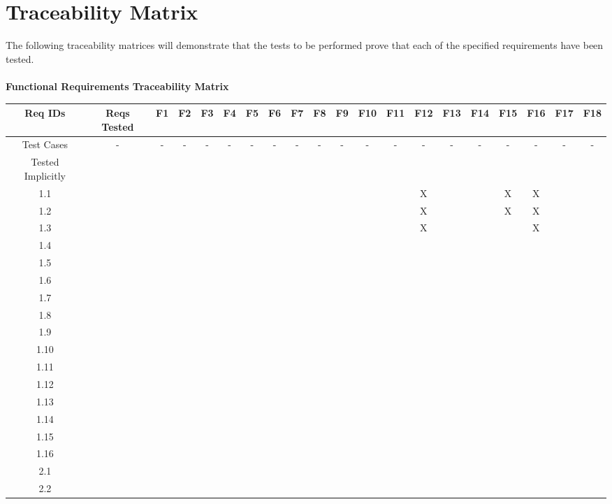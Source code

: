 \documentclass[titlepage]{article}
\begin{document}
\section{Traceability Matrix}
The following traceability matrices will demonstrate that the tests to be performed prove that each of the specified requirements have been tested.\\~\\
\large{\textbf{Functional Requirements Traceability Matrix}}
\begin{center}%
\begin{table}[h!]
\hspace*{-7.5mm}
\begin{tabular}{|c|c|c|c|c |c|c|c|c|c |c|c|c|c|c |c|c|c|c|c|}\hline
\multicolumn{1}{|C{1.5}|}{Req IDs}	&\multicolumn{1}{|C{1}|}{Reqs Tested}	&F1	&F2	&F3	&F4	&F5	&F6	&F7	&F8	&F9	&F10	&F11	&F12	&F13	&F14	&F15	&F16	&F17	&F18\\\hline
\multicolumn{1}{|C{1.5}|}{Test Cases}&- &- &- &- &- &- &- &- &- &- &- &- &- &- &- &- &- &- &-\\\hline
\multicolumn{1}{|C{1.5}|}{Tested Implicitly}&&&& &&&&& &&&&& &&&&&\\\hline
1.1 &&&& &&&&& &&&&X& &&X&X&&\\\hline
1.2 &&&& &&&&& &&&&X& &&X&X&&\\\hline
1.3 &&&& &&&&& &&&&X& &&&X&&\\\hline
1.4 &&&& &&&&& &&&&& &&&&&\\\hline
1.5 &&&& &&&&& &&&&& &&&&&\\\hline
1.6 &&&& &&&&& &&&&& &&&&&\\\hline
1.7 &&&& &&&&& &&&&& &&&&&\\\hline
1.8 &&&& &&&&& &&&&& &&&&&\\\hline
1.9 &&&& &&&&& &&&&& &&&&&\\\hline
1.10 &&&& &&&&& &&&&& &&&&&\\\hline
1.11 &&&& &&&&& &&&&& &&&&&\\\hline
1.12 &&&& &&&&& &&&&& &&&&&\\\hline
1.13 &&&& &&&&& &&&&& &&&&&\\\hline
1.14 &&&& &&&&& &&&&& &&&&&\\\hline
1.15 &&&& &&&&& &&&&& &&&&&\\\hline
1.16 &&&& &&&&& &&&&& &&&&&\\\hline
2.1 &&&& &&&&& &&&&& &&&&&\\\hline
2.2 &&&& &&&&& &&&&& &&&&&\\\hline

\end{tabular}
\end{table}
\end{center}
\end{document}
